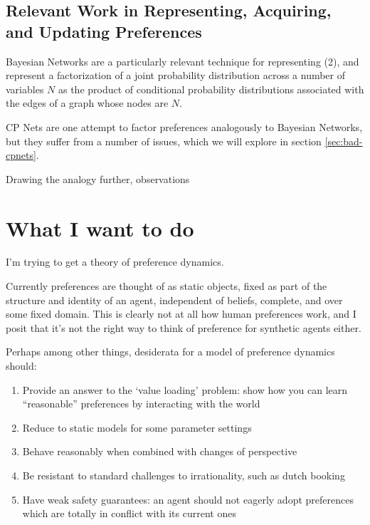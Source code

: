\documentclass{article}
\begin{document}
	\subsection*{Relevant Work in Representing, Acquiring, and Updating Preferences}
	
	
	Bayesian Networks are a particularly relevant technique for representing (2), and represent a factorization of a joint probability distribution across a number of variables $N$ as the product of conditional probability distributions associated with the edges of a graph whose nodes are $N$.	
	
	

	 CP Nets \cite{boutilier2004cp} are one attempt to factor preferences analogously to Bayesian Networks, but they suffer from a number of issues, which we will explore in section \ref{sec:bad-cpnets}. 
	
	
	Drawing the analogy further, observations 	
	
	
	
	
	\section{What I want to do}
	I'm trying to get a theory of preference dynamics.
	
	Currently preferences are thought of as static objects, fixed as part of the structure and identity of an agent, independent of beliefs, complete, and over some fixed domain. This is clearly not at all how human preferences work, and I posit that it's not the right way to think of preference for synthetic agents either.
	
	Perhaps among other things, desiderata for a model of preference dynamics should:
	\begin{enumerate}[noitemsep]
		\item Provide an answer to the `value loading' problem: show how you can learn ``reasonable'' preferences by interacting with the world
		\item Reduce to static models for some parameter settings
		\item Behave reasonably when combined with changes of perspective 
		\item Be resistant to standard challenges to irrationality, such as dutch booking
		\item Have weak safety guarantees: an agent should not eagerly adopt preferences which are totally in conflict with its current ones
	\end{enumerate}
	
\end{document}
